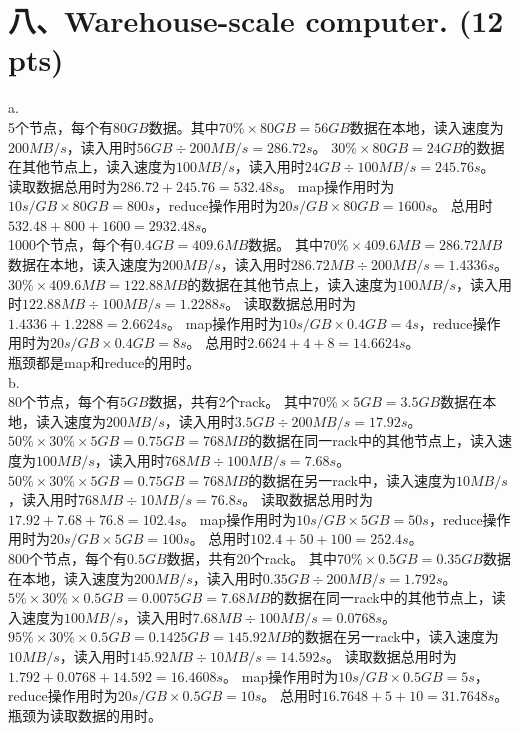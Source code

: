 \documentclass[UTF8]{ctexart}
\begin{document}
\section*{八、Warehouse-scale computer. (12 pts)}
a. \\
5个节点，每个有$80GB$数据。其中$70\%\times80GB=56GB$数据在本地，读入速度为$200MB/s$，读入用时$56GB\div200MB/s=286.72s$。
$30\%\times80GB=24GB$的数据在其他节点上，读入速度为$100MB/s$，读入用时$24GB\div100MB/s=245.76s$。
读取数据总用时为$286.72+245.76=532.48s$。
map操作用时为$10s/GB\times80GB=800s$，reduce操作用时为$20s/GB\times80GB=1600s$。
总用时$532.48+800+1600=2932.48s$。\\

1000个节点，每个有$0.4GB=409.6MB$数据。
其中$70\%\times409.6MB=286.72MB$数据在本地，读入速度为$200MB/s$，读入用时$286.72MB\div200MB/s=1.4336s$。
$30\%\times409.6MB=122.88MB$的数据在其他节点上，读入速度为$100MB/s$，读入用时$122.88MB\div100MB/s=1.2288s$。
读取数据总用时为$1.4336+1.2288=2.6624s$。
map操作用时为$10s/GB\times0.4GB=4s$，reduce操作用时为$20s/GB\times0.4GB=8s$。
总用时$2.6624+4+8=14.6624s$。\\

瓶颈都是map和reduce的用时。\\
b. \\
80个节点，每个有$5GB$数据，共有2个rack。
其中$70\%\times5GB=3.5GB$数据在本地，读入速度为$200MB/s$，读入用时$3.5GB\div200MB/s=17.92s$。
$50\%\times30\%\times5GB=0.75GB=768MB$的数据在同一rack中的其他节点上，读入速度为$100MB/s$，读入用时$768MB\div100MB/s=7.68s$。
$50\%\times30\%\times5GB=0.75GB=768MB$的数据在另一rack中，读入速度为$10MB/s$，读入用时$768MB\div10MB/s=76.8s$。
读取数据总用时为$17.92+7.68+76.8=102.4s$。
map操作用时为$10s/GB\times5GB=50s$，reduce操作用时为$20s/GB\times5GB=100s$。
总用时$102.4+50+100=252.4s$。\\

800个节点，每个有$0.5GB$数据，共有20个rack。
其中$70\%\times0.5GB=0.35GB$数据在本地，读入速度为$200MB/s$，读入用时$0.35GB\div200MB/s=1.792s$。
$5\%\times30\%\times0.5GB=0.0075GB=7.68MB$的数据在同一rack中的其他节点上，读入速度为$100MB/s$，读入用时$7.68MB\div100MB/s=0.0768s$。
$95\%\times30\%\times0.5GB=0.1425GB=145.92MB$的数据在另一rack中，读入速度为$10MB/s$，读入用时$145.92MB\div10MB/s=14.592s$。
读取数据总用时为$1.792+0.0768+14.592=16.4608s$。
map操作用时为$10s/GB\times0.5GB=5s$，reduce操作用时为$20s/GB\times0.5GB=10s$。
总用时$16.7648+5+10=31.7648s$。\\

瓶颈为读取数据的用时。\\
\end{document}

